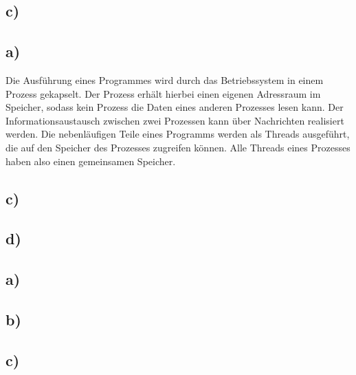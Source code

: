 \documentclass[ngerman]{fbi-aufgabenblatt}
\begin{document}
\setcounter{section}{1}

\subsection*{c)}



\subsection*{a)}
Die Ausführung eines Programmes wird durch das Betriebssystem in einem Prozess gekapselt. Der Prozess erhält hierbei einen eigenen Adressraum im Speicher, sodass kein Prozess die Daten eines anderen Prozesses lesen kann. Der Informationsaustausch zwischen zwei Prozessen kann über Nachrichten realisiert werden. Die nebenläufigen Teile eines Programms werden als Threads ausgeführt, die auf den Speicher des Prozesses zugreifen können. Alle Threads eines Prozesses haben also einen gemeinsamen Speicher.

\subsection*{c)}
\subsection*{d)}


\subsection*{a)}
\subsection*{b)}
\subsection*{c)}
\end{document}

